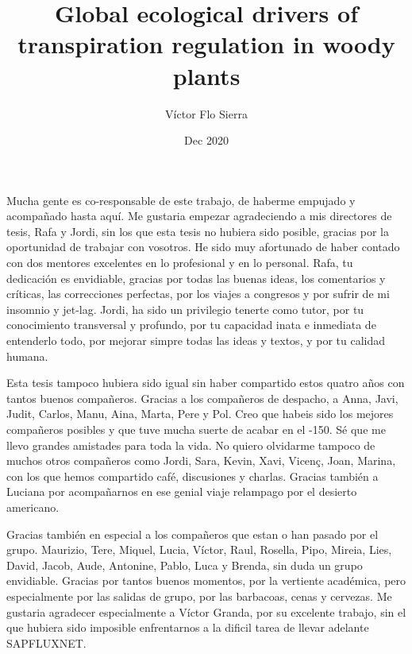 \documentclass[11pt,twoside]{reedthesis}
\title{Global ecological drivers of transpiration regulation in woody plants}
\author{Víctor Flo Sierra}
\date{Dec 2020}
\begin{document}
  \maketitle

\frontmatter %
\pagestyle{empty} %
  \begin{acknowledgements}
    \setlength{\parindent}{30pt} Mucha gente es co-responsable de este
    trabajo, de haberme empujado y acompañado hasta aquí. Me gustaria
    empezar agradeciendo a mis directores de tesis, Rafa y Jordi, sin los
    que esta tesis no hubiera sido posible, gracias por la oportunidad de
    trabajar con vosotros. He sido muy afortunado de haber contado con dos
    mentores excelentes en lo profesional y en lo personal. Rafa, tu
    dedicación es envidiable, gracias por todas las buenas ideas, los
    comentarios y críticas, las correcciones perfectas, por los viajes a
    congresos y por sufrir de mi insomnio y jet-lag. Jordi, ha sido un
    privilegio tenerte como tutor, por tu conocimiento transversal y
    profundo, por tu capacidad inata e inmediata de entenderlo todo, por
    mejorar simpre todas las ideas y textos, y por tu calidad humana.\par
    Esta tesis tampoco hubiera sido igual sin haber compartido estos quatro
    años con tantos buenos compañeros. Gracias a los compañeros de despacho,
    a Anna, Javi, Judit, Carlos, Manu, Aina, Marta, Pere y Pol. Creo que
    habeis sido los mejores compañeros posibles y que tuve mucha suerte de
    acabar en el -150. Sé que me llevo grandes amistades para toda la vida.
    No quiero olvidarme tampoco de muchos otros compañeros como Jordi, Sara,
    Kevin, Xavi, Vicenç, Joan, Marina, con los que hemos compartido café,
    discusiones y charlas. Gracias también a Luciana por acompañarnos en ese
    genial viaje relampago por el desierto americano.\par
    Gracias también en especial a los compañeros que estan o han pasado por
    el grupo. Maurizio, Tere, Miquel, Lucia, Víctor, Raul, Rosella, Pipo,
    Mireia, Lies, David, Jacob, Aude, Antonine, Pablo, Luca y Brenda, sin
    duda un grupo envidiable. Gracias por tantos buenos momentos, por la
    vertiente académica, pero especialmente por las salidas de grupo, por
    las barbacoas, cenas y cervezas. Me gustaria agradecer especialmente a
    Víctor Granda, por su excelente trabajo, sin el que hubiera sido
    imposible enfrentarnos a la dificil tarea de llevar adelante SAPFLUXNET.

\end{acknowledgements}
\end{document}
